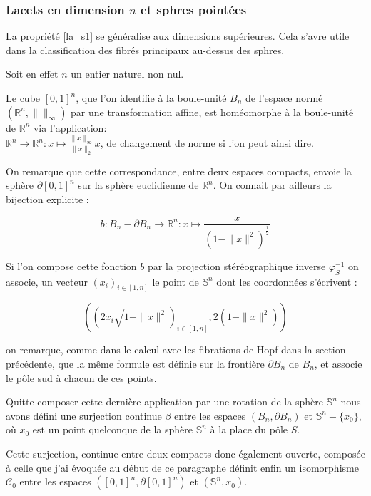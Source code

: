 \subsubsection{Lacets en dimension $n$ et sphres point\'ees}

La propri\'et\'e \ref{la_s1} se g\'en\'eralise aux dimensions sup\'erieures. %
Cela s'avre utile dans la classification des fibr\'es principaux au-dessus des sphres.
%

\par
Soit en effet $n$ un entier naturel non nul.

\par
Le cube $[0,1]^n$, que l'on identifie à la boule-unité $B_n$ de l'espace normé $(\mathbb{R}^n,\| \|_{\infty})$ par une transformation affine, est homéomorphe à la boule-unité de $\mathbb{R}^n$ via l'application:\\
$\mathbb{R}^n \rightarrow\mathbb{R}^n : x \mapsto \frac{\|x\|_{\infty}}{\|x\|_2}x$, de changement de norme si l'on peut ainsi dire.

\par
On remarque que cette correspondance, entre deux espaces compacts, envoie la sphère $\partial{[0,1]^n}$ sur la sphère euclidienne de $\mathbb{R}^n$. %
On connait par ailleurs la bijection explicite :

\[b : B_n - \partial{B_n} \rightarrow \mathbb{R}^n : x \mapsto \frac{x}{(1-\|x\|^2)^{\frac{1}{2}}}\]

Si l'on compose cette fonction $b$ par la projection stéréographique inverse $\varphi_S^{-1}$ %
on associe,  un vecteur $(x_i)_{i \in [1,n]}$ le point de $\mathbb{S}^n$ dont les coordonnées s'écrivent :

\[((2x_i\sqrt{1-\|x\|^2})_{i \in [1,n]},2(1-\|x\|^2))\]

on remarque, comme dans le calcul avec les fibrations de Hopf dans la section précédente, %
que la même formule est définie sur la frontière $\partial{B_n}$ de $B_n$, et associe le pôle sud à chacun de ces points.

\par
Quitte  composer cette dernière application par une rotation de la sphère $\mathbb{S}^n$ %
nous avons défini une surjection continue $\beta$ entre les espaces $(B_n,\partial{B_n})$ et $\mathbb{S}^n - \{x_0\}$, %
où $x_0$ est un point quelconque de la sphère $\mathbb{S}^n$ à la place du pôle $S$.

\par
Cette surjection, continue entre deux compacts donc également ouverte, %
composée à celle que j'ai évoquée au début de ce paragraphe définit enfin un isomorphisme $\mathcal{C}_0$ %
entre les espaces $([0,1]^n,\partial{[0,1]^n})$ et $(\mathbb{S}^n,x_0)$.

